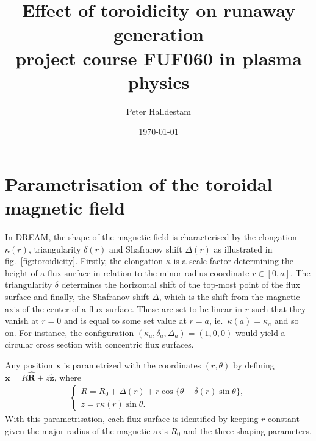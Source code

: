 \documentclass[11pt,a4paper]{article}
\title{Effect of toroidicity on runaway generation\\\vspace{.3cm} \large{project course FUF060 in plasma physics}}
\author{Peter Halldestam}
\date{\today}
\renewcommand{\vec}[1]{\boldsymbol{\mathbf{#1}}}
\begin{document}
\maketitle


\section{Parametrisation of the toroidal magnetic field}
In \textsc{DREAM}, the shape of the magnetic field is characterised by the elongation $\kappa(r)$, triangularity $\delta(r)$ and Shafranov shift $\Delta(r)$ as illustrated in fig.\ \ref{fig:toroidicity}.
Firstly, the elongation $\kappa$ is a scale factor determining the height of a flux surface in relation to the minor radius coordinate $r\in[0, a]$.
The triangularity $\delta$ determines the horizontal shift of the top-most point of the flux surface and finally, the Shafranov shift $\Delta$, which is the shift from the magnetic axis of the center of a flux surface.
These are set to be linear in $r$ such that they vanish at $r=0$ and is equal to some set value at $r=a$, ie.\ $\kappa(a)=\kappa_a$ and so on.
For instance, the configuration $(\kappa_a, \delta_a, \Delta_a)=(1, 0, 0)$ would yield a circular cross section with concentric flux surfaces.

Any position $\vec{x}$ is parametrized with the coordinates $(r, \theta)$ by defining $\vec{x}=R\vec{\hat{R}}+z\vec{\hat{z}}$, where
\begin{align}
    \label{eq:param}
    \begin{cases}
        R
        =R_0+\Delta(r)+r\cos\{\theta+\delta(r)\sin\theta\},\\
        z
        =r\kappa(r)\sin\theta.
    \end{cases}
\end{align}
With this parametrisation, each flux surface is identified by keeping $r$ constant given the major radius of the magnetic axis $R_0$ and the three shaping parameters.\\
\end{document}
